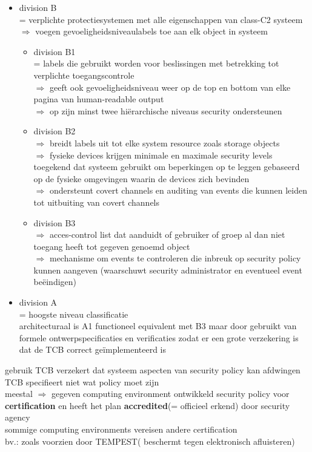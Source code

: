 \documentclass{report}
\begin{document}
\begin{itemize}
\begin{itemize}
\end{itemize}
\item division B
\\ = verplichte protectiesystemen met alle eigenschappen van class-C2 systeem
\\ $\Rightarrow$ voegen gevoeligheidsniveaulabels toe aan elk object in systeem
\begin{itemize}
\item division B1
\\ = labels die gebruikt worden voor beslissingen met betrekking tot verplichte toegangscontrole
\\$\Rightarrow$ geeft ook gevoeligheidsniveau weer op de top en bottom van elke pagina van human-readable output
\\$\Rightarrow$ op zijn minst twee hi\"erarchische niveaus security ondersteunen
\item division B2
\\$\Rightarrow$ breidt labels uit tot elke system resource zoals storage objects
\\$\Rightarrow$ fysieke devices krijgen minimale en maximale security levels toegekend dat systeem gebruikt om beperkingen op te leggen gebaseerd op de fysieke omgevingen waarin de devices zich bevinden 
\\$\Rightarrow$ ondersteunt covert channels en auditing van events die kunnen leiden tot uitbuiting van covert channels
\item division B3
\\ $\Rightarrow$ acces-control list dat aanduidt of gebruiker of groep al dan niet toegang heeft tot gegeven genoemd object
\\$\Rightarrow$ mechanisme om events te controleren die inbreuk op security policy kunnen aangeven (waarschuwt security administrator en eventueel event be\"eindigen)
\end{itemize}
\item division A
\\= hoogste niveau classificatie
\\architecturaal is A1 functioneel equivalent met B3 maar door gebruikt van formele ontwerpspecificaties en verificaties zodat er een grote verzekering is dat de TCB correct ge\"implementeerd is

\end{itemize}
gebruik TCB verzekert dat systeem aspecten van security policy kan afdwingen
\\TCB specifieert niet wat policy moet zijn
\\meestal $\Rightarrow$ gegeven computing environment ontwikkeld security policy voor \textbf{certification}
en heeft het plan \textbf{accredited}(= officieel erkend) door security agency
\\sommige computing environments vereisen andere certification
\\bv.: zoals voorzien door TEMPEST( beschermt tegen elektronisch afluisteren)
\end{document}

